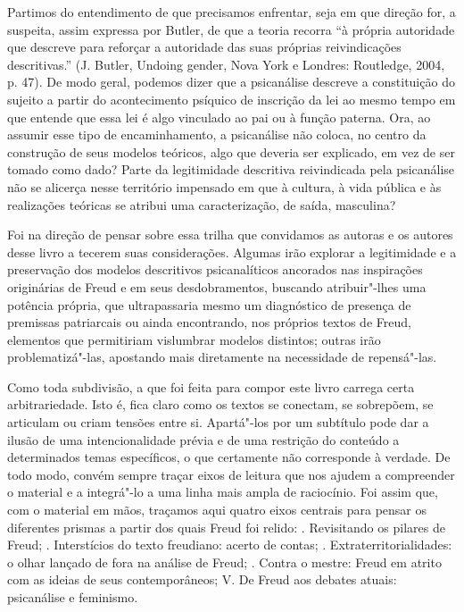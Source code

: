 Partimos do entendimento de que precisamos enfrentar, seja em que
direção for, a suspeita, assim expressa por Butler, de que a teoria
recorra ``à própria autoridade que descreve para reforçar a autoridade
das suas próprias reivindicações descritivas.'' (J. Butler, Undoing
gender, Nova York e Londres: Routledge, 2004, p. 47). De modo geral,
podemos dizer que a psicanálise descreve a constituição do sujeito a
partir do acontecimento psíquico de inscrição da lei ao mesmo tempo em
que entende que essa lei é algo vinculado ao pai ou à função paterna.
Ora, ao assumir esse tipo de encaminhamento, a psicanálise não coloca,
no centro da construção de seus modelos teóricos, algo que deveria ser
explicado, em vez de ser tomado como dado? Parte da legitimidade
descritiva reivindicada pela psicanálise não se alicerça nesse
território impensado em que à cultura, à vida pública e às realizações
teóricas se atribui uma caracterização, de saída, masculina?

Foi na direção de pensar sobre essa trilha que convidamos as autoras e
os autores desse livro a tecerem suas considerações. Algumas irão
explorar a legitimidade e a preservação dos modelos descritivos
psicanalíticos ancorados nas inspirações originárias de Freud e em seus
desdobramentos, buscando atribuir"-lhes uma potência própria, que
ultrapassaria mesmo um diagnóstico de presença de premissas patriarcais
ou ainda encontrando, nos próprios textos de Freud, elementos que
permitiriam vislumbrar modelos distintos; outras irão problematizá"-las,
apostando mais diretamente na necessidade de repensá"-las.

\asterisc

Como toda subdivisão, a que foi feita para compor este livro carrega
certa arbitrariedade. Isto é, fica claro como os textos se conectam, se
sobrepõem, se articulam ou criam tensões entre si. Apartá"-los por um
subtítulo pode dar a ilusão de uma intencionalidade prévia e de uma
restrição do conteúdo a determinados temas específicos, o que certamente
não corresponde à verdade. De todo modo, convém sempre traçar eixos de
leitura que nos ajudem a compreender o material e a integrá"-lo a uma
linha mais ampla de raciocínio. Foi assim que, com o material em mãos,
traçamos aqui quatro eixos centrais para pensar os diferentes prismas a
partir dos quais Freud foi relido: . Revisitando os pilares de Freud;
. Interstícios do texto freudiano: acerto de contas; .
Extraterritorialidades: o olhar lançado de fora na análise de Freud; .
Contra o mestre: Freud em atrito com as ideias de seus contemporâneos;
V. De Freud aos debates atuais: psicanálise e feminismo.

